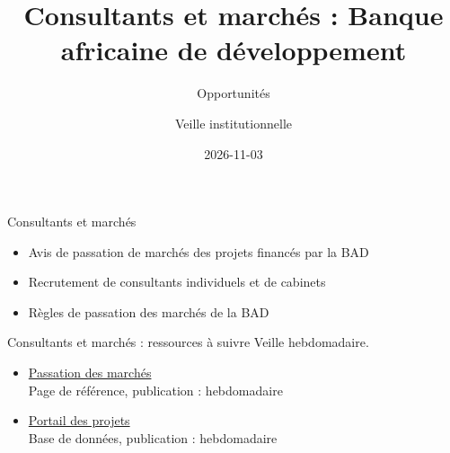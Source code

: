 \documentclass[aspectratio=169,11pt]{beamer}
\title{Consultants et marchés : Banque africaine de développement}
\subtitle{Opportunités}
\author{Veille institutionnelle}
\date{2026-11-03}
\begin{document}
\begin{frame}\titlepage\end{frame}

\begin{frame}{Consultants et marchés}
\begin{itemize}
\item Avis de passation de marchés des projets financés par la BAD
\item Recrutement de consultants individuels et de cabinets
\item Règles de passation des marchés de la BAD
\end{itemize}
\end{frame}

\begin{frame}{Consultants et marchés : ressources à suivre}
\small
Veille hebdomadaire.
\begin{itemize}
\item \href{https://www.afdb.org/en/projects-and-operations/procurement}{Passation des marchés}\\{\footnotesize Page de référence, publication : hebdomadaire}
\item \href{https://projectsportal.afdb.org}{Portail des projets}\\{\footnotesize Base de données, publication : hebdomadaire}
\end{itemize}
\end{frame}
\end{document}
